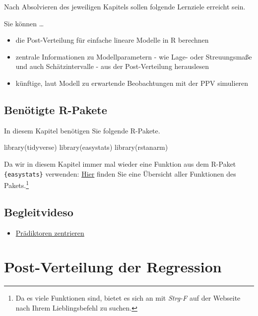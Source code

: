 \documentclass[
  a4paper,
  DIV=11]{scrreprt}
\newenvironment{Shaded}{\begin{snugshade}}{\end{snugshade}}
\newcommand{\FunctionTok}[1]{\textcolor[rgb]{0.28,0.35,0.67}{#1}}
\newcommand{\NormalTok}[1]{\textcolor[rgb]{0.00,0.23,0.31}{#1}}
\providecommand{\tightlist}{%
  \setlength{\itemsep}{0pt}\setlength{\parskip}{0pt}}\usepackage{longtable,booktabs,array}
\theoremstyle{definition}
\theoremstyle{remark}
\begin{document}
Nach Absolvieren des jeweiligen Kapitels sollen folgende Lernziele
erreicht sein.

Sie können \ldots{}

\begin{itemize}
\tightlist
\item
  die Post-Verteilung für einfache lineare Modelle in R berechnen
\item
  zentrale Informationen zu Modellparametern - wie Lage- oder
  Streuungsmaße und auch Schätzintervalle - aus der Post-Verteilung
  herauslesen
\item
  künftige, laut Modell zu erwartende Beobachtungen mit der PPV
  simulieren
\end{itemize}

\hypertarget{benuxf6tigte-r-pakete-5}{%
\subsection{Benötigte R-Pakete}\label{benuxf6tigte-r-pakete-5}}

In diesem Kapitel benötigen Sie folgende R-Pakete.

\begin{Shaded}
\begin{Highlighting}[]
\FunctionTok{library}\NormalTok{(tidyverse)}
\FunctionTok{library}\NormalTok{(easystats)}
\FunctionTok{library}\NormalTok{(rstanarm)}
\end{Highlighting}
\end{Shaded}

Da wir in diesem Kapitel immer mal wieder eine Funktion aus dem R-Paket
\texttt{\{easystats\}} verwenden:
\href{https://easystats.github.io/easystats/articles/list_of_functions.html}{Hier}
finden Sie eine Übersicht aller Funktionen des Pakets.\footnote{Da es
  viele Funktionen sind, bietet es sich an mit \emph{Strg-F} auf der
  Webseite nach Ihrem Lieblingsbefehl zu suchen.}

\hypertarget{begleitvideso}{%
\subsection{Begleitvideso}\label{begleitvideso}}

\begin{itemize}
\tightlist
\item
  \href{https://youtu.be/3Z1dXPO_MSE}{Prädiktoren zentrieren}
\end{itemize}

\hypertarget{post-verteilung-der-regression}{%
\section{Post-Verteilung der
Regression}\label{post-verteilung-der-regression}}
\end{document}

